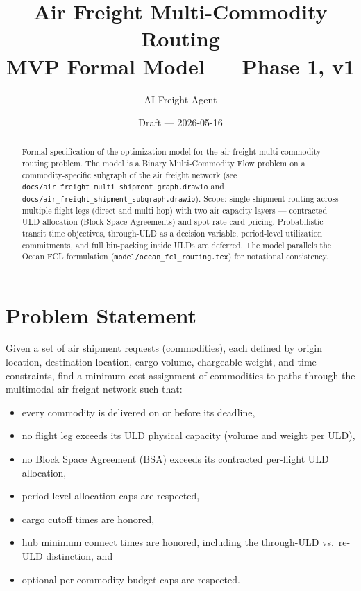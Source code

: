 \documentclass[11pt,a4paper]{article}
\title{\textbf{Air Freight Multi-Commodity Routing}\\[0.4em]
\large MVP Formal Model --- Phase 1, v1}
\author{AI Freight Agent}
\date{Draft --- 2026-05-16}
\theoremstyle{definition}
\begin{document}
\maketitle

\begin{abstract}
Formal specification of the optimization model for the air freight multi-commodity routing
problem. The model is a Binary Multi-Commodity Flow problem on a commodity-specific subgraph
of the air freight network (see \texttt{docs/air\_freight\_multi\_shipment\_graph.drawio}
and \texttt{docs/air\_freight\_shipment\_subgraph.drawio}). Scope: single-shipment routing
across multiple flight legs (direct and multi-hop) with two air capacity layers — contracted
ULD allocation (Block Space Agreements) and spot rate-card pricing. Probabilistic transit
time objectives, through-ULD as a decision variable, period-level utilization commitments,
and full bin-packing inside ULDs are deferred. The model parallels the Ocean FCL formulation
(\texttt{model/ocean\_fcl\_routing.tex}) for notational consistency.
\end{abstract}

\tableofcontents
\newpage

\section{Problem Statement}

Given a set of air shipment requests (commodities), each defined by origin location, destination
location, cargo volume, chargeable weight, and time constraints, find a minimum-cost assignment
of commodities to paths through the multimodal air freight network such that:
\begin{itemize}[noitemsep]
  \item every commodity is delivered on or before its deadline,
  \item no flight leg exceeds its ULD physical capacity (volume and weight per ULD),
  \item no Block Space Agreement (BSA) exceeds its contracted per-flight ULD allocation,
  \item period-level allocation caps are respected,
  \item cargo cutoff times are honored,
  \item hub minimum connect times are honored, including the through-ULD vs.\ re-ULD distinction, and
  \item optional per-commodity budget caps are respected.
\end{itemize}
\end{document}
